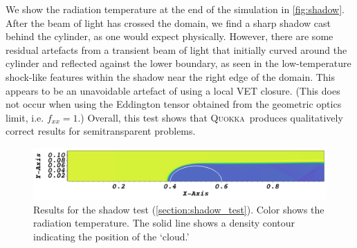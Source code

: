\documentclass[fleqn,usenatbib]{mnras}
\newcommand{\quokka}{\textsc{Quokka}}
\begin{document}
We show the radiation temperature at the end of the simulation in \autoref{fig:shadow}. After the beam of light has crossed the domain, we find a sharp shadow cast behind the cylinder, as one would expect physically. However, there are some residual artefacts from a transient beam of light that initially curved around the cylinder and reflected against the lower boundary, as seen in the low-temperature shock-like features within the shadow near the right edge of the domain. This appears to be an unavoidable artefact of using a local VET closure. (This does not occur when using the Eddington tensor obtained from the geometric optics limit, i.e. $f_{xx} = 1$.) Overall, this test shows that \quokka~produces qualitatively correct results for semitransparent problems.
\begin{figure}
    \includegraphics[width=\textwidth]{shadow1.png}
    \caption{Results for the shadow test (\autoref{section:shadow_test}). Color shows the radiation temperature. The solid line shows a density contour indicating the position of the `cloud.'}
    \label{fig:shadow}
\end{figure}
\end{document}
